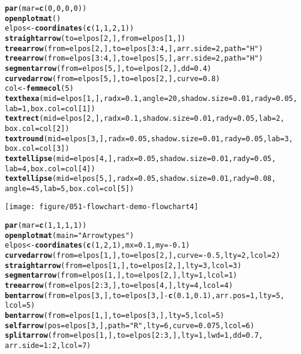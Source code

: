 \documentclass{article}\usepackage{graphicx, color}
\makeatletter
\def\maxwidth{ %
  \ifdim\Gin@nat@width>\linewidth
    \linewidth
  \else
    \Gin@nat@width
  \fi
}
\newcommand{\hlfunctioncall}[1]{\textcolor[rgb]{0.501960784313725,0,0.329411764705882}{\textbf{#1}}}%
\newcommand{\hlstring}[1]{\textcolor[rgb]{0.6,0.6,1}{#1}}%
\newenvironment{kframe}{%
 \def\at@end@of@kframe{}%
 \ifinner\ifhmode%
  \def\at@end@of@kframe{\end{minipage}}%
  \begin{minipage}{\columnwidth}%
 \fi\fi%
 \def\FrameCommand##1{\hskip\@totalleftmargin \hskip-\fboxsep
 \colorbox{shadecolor}{##1}\hskip-\fboxsep
     \hskip-\linewidth \hskip-\@totalleftmargin \hskip\columnwidth}%
 \MakeFramed {\advance\hsize-\width
   \@totalleftmargin\z@ \linewidth\hsize
   \@setminipage}}%
 {\par\unskip\endMakeFramed%
 \at@end@of@kframe}
\newenvironment{knitrout}{}{} %
\makeatother
\begin{document}
\begin{knitrout}
\begin{kframe}
\begin{alltt}
\hlfunctioncall{par}(mar = \hlfunctioncall{c}(0, 0, 0, 0))
\hlfunctioncall{openplotmat}()
elpos <- \hlfunctioncall{coordinates}(\hlfunctioncall{c}(1, 1, 2, 1))
\hlfunctioncall{straightarrow}(to = elpos[2, ], from = elpos[1, ])
\hlfunctioncall{treearrow}(from = elpos[2, ], to = elpos[3:4, ], arr.side = 2, path = \hlstring{"H"})
\hlfunctioncall{treearrow}(from = elpos[3:4, ], to = elpos[5, ], arr.side = 2, path = \hlstring{"H"})
\hlfunctioncall{segmentarrow}(from = elpos[5, ], to = elpos[2, ], dd = 0.4)
\hlfunctioncall{curvedarrow}(from = elpos[5, ], to = elpos[2, ], curve = 0.8)
col <- \hlfunctioncall{femmecol}(5)
\hlfunctioncall{texthexa}(mid = elpos[1, ], radx = 0.1, angle = 20, shadow.size = 0.01, rady = 0.05, 
    lab = 1, box.col = col[1])
\hlfunctioncall{textrect}(mid = elpos[2, ], radx = 0.1, shadow.size = 0.01, rady = 0.05, lab = 2, 
    box.col = col[2])
\hlfunctioncall{textround}(mid = elpos[3, ], radx = 0.05, shadow.size = 0.01, rady = 0.05, lab = 3, 
    box.col = col[3])
\hlfunctioncall{textellipse}(mid = elpos[4, ], radx = 0.05, shadow.size = 0.01, rady = 0.05, 
    lab = 4, box.col = col[4])
\hlfunctioncall{textellipse}(mid = elpos[5, ], radx = 0.05, shadow.size = 0.01, rady = 0.08, 
    angle = 45, lab = 5, box.col = col[5])
\end{alltt}
\end{kframe}
\texttt{[image: figure/051-flowchart-demo-flowchart4]} 
\begin{kframe}\begin{alltt}



\hlfunctioncall{par}(mar = \hlfunctioncall{c}(1, 1, 1, 1))
\hlfunctioncall{openplotmat}(main = \hlstring{"Arrowtypes"})
elpos <- \hlfunctioncall{coordinates}(\hlfunctioncall{c}(1, 2, 1), mx = 0.1, my = -0.1)
\hlfunctioncall{curvedarrow}(from = elpos[1, ], to = elpos[2, ], curve = -0.5, lty = 2, lcol = 2)
\hlfunctioncall{straightarrow}(from = elpos[1, ], to = elpos[2, ], lty = 3, lcol = 3)
\hlfunctioncall{segmentarrow}(from = elpos[1, ], to = elpos[2, ], lty = 1, lcol = 1)
\hlfunctioncall{treearrow}(from = elpos[2:3, ], to = elpos[4, ], lty = 4, lcol = 4)
\hlfunctioncall{bentarrow}(from = elpos[3, ], to = elpos[3, ] - \hlfunctioncall{c}(0.1, 0.1), arr.pos = 1, lty = 5, 
    lcol = 5)
\hlfunctioncall{bentarrow}(from = elpos[1, ], to = elpos[3, ], lty = 5, lcol = 5)
\hlfunctioncall{selfarrow}(pos = elpos[3, ], path = \hlstring{"R"}, lty = 6, curve = 0.075, lcol = 6)
\hlfunctioncall{splitarrow}(from = elpos[1, ], to = elpos[2:3, ], lty = 1, lwd = 1, dd = 0.7, 
    arr.side = 1:2, lcol = 7)


\end{alltt}
\end{kframe}
\end{knitrout}
\end{document}
